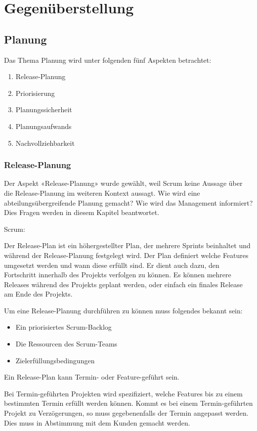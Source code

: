 \chapter{Gegenüberstellung}
\thispagestyle{fancy}
\section{Planung}

Das Thema Planung wird unter folgenden fünf Aspekten betrachtet:
\begin{enumerate}
\item Release-Planung
\item Priorisierung
\item Planungssicherheit
\item Planungsaufwands
\item Nachvollziehbarkeit
\end{enumerate}

\subsection{Release-Planung}

Der Aspekt «Release-Planung» wurde gewählt, weil Scrum keine Aussage über die Release-Planung im weiteren Kontext aussagt. Wie wird eine abteilungsübergreifende Planung gemacht? Wie wird das Management informiert? Dies Fragen werden in diesem Kapitel beantwortet.

{\Large Scrum:} \cite{planningReleaseScrum} \medskip

Der Release-Plan ist ein höhergestellter Plan, der mehrere Sprints beinhaltet und während der Release-Planung festgelegt wird. Der Plan definiert welche Features umgesetzt werden und wann diese erfüllt sind. Er dient auch dazu, den Fortschritt innerhalb des Projekts verfolgen zu können. Es können mehrere Releases während des Projekts geplant werden, oder einfach ein finales Release am Ende des Projekts. \medskip

Um eine Release-Planung durchführen zu können muss folgendes bekannt sein:
\begin{itemize}
\item Ein priorisiertes Scrum-Backlog
\item Die Ressourcen des Scrum-Teams
\item Zielerfüllungsbedingungen
\end{itemize}
Ein Release-Plan kann Termin- oder Feature-geführt sein.\smallskip

Bei Termin-geführten Projekten wird spezifiziert, welche Features bis zu einem bestimmten Termin erfüllt werden können.\smallskip
Kommt es bei einem Termin-geführten Projekt zu Verzögerungen, so muss gegebenenfalls der Termin angepasst werden. Dies muss in Abstimmung mit dem Kunden gemacht werden.

